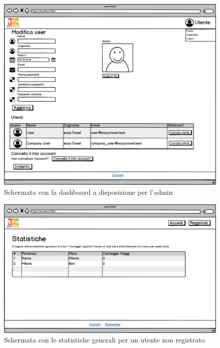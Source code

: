 \documentclass[11pt]{article}
\begin{document}
\begin{figure}[!ht]
	\includegraphics[width=1\textwidth]{./Mockup/Profilo-admin} %
	\caption{Schermata con la dashboard a disposizione per l'admin}
	\label{fig:profiloadmin}
\end{figure}

\begin{figure}[!ht]
	\includegraphics[width=1\textwidth]{./Mockup/Statistiche-non-registrato} %
	\caption{Schermata con le statistiche generali per un utente non registrato}
	\label{fig:statistichenonreg}
\end{figure}
\end{document}
